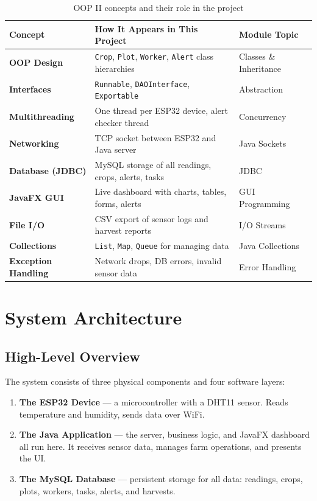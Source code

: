 \documentclass[12pt, a4paper]{report}
\begin{document}
\begin{table}[H]
\centering
\renewcommand{\arraystretch}{1.5}
\begin{tabularx}{\textwidth}{>{\bfseries}l X l}
\toprule
\textbf{Concept} & \textbf{How It Appears in This Project} & \textbf{Module Topic} \\
\midrule
OOP Design        & \texttt{Crop}, \texttt{Plot}, \texttt{Worker}, \texttt{Alert} class hierarchies & Classes \& Inheritance \\
Interfaces        & \texttt{Runnable}, \texttt{DAOInterface}, \texttt{Exportable} & Abstraction \\
Multithreading    & One thread per ESP32 device, alert checker thread & Concurrency \\
Networking        & TCP socket between ESP32 and Java server & Java Sockets \\
Database (JDBC)   & MySQL storage of all readings, crops, alerts, tasks & JDBC \\
JavaFX GUI        & Live dashboard with charts, tables, forms, alerts & GUI Programming \\
File I/O          & CSV export of sensor logs and harvest reports & I/O Streams \\
Collections       & \texttt{List}, \texttt{Map}, \texttt{Queue} for managing data & Java Collections \\
Exception Handling & Network drops, DB errors, invalid sensor data & Error Handling \\
\bottomrule
\end{tabularx}
\caption{OOP II concepts and their role in the project}
\end{table}


\chapter{System Architecture}

\section{High-Level Overview}

The system consists of three physical components and four software layers:

\begin{enumerate}[leftmargin=*, label=\textbf{\arabic*.}]
    \item \textbf{The ESP32 Device} --- a microcontroller with a DHT11 sensor. Reads temperature and humidity, sends data over WiFi.
    \item \textbf{The Java Application} --- the server, business logic, and JavaFX dashboard all run here. It receives sensor data, manages farm operations, and presents the UI.
    \item \textbf{The MySQL Database} --- persistent storage for all data: readings, crops, plots, workers, tasks, alerts, and harvests.
\end{enumerate}
\end{document}
